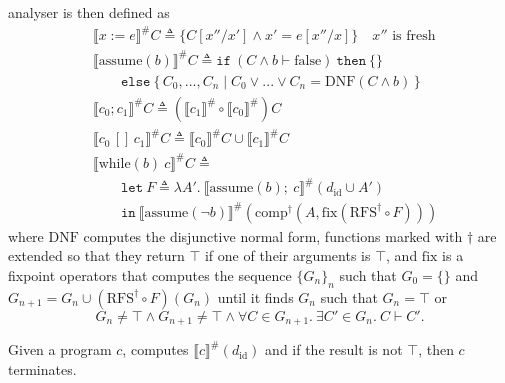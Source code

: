 \dta analyser is then defined as
\begin{align*}
  &\llbracket x:=e \rrbracket^\# C \triangleq \{ C[x''/x'] \wedge x' = e[x''/x]\}\quad x''\text{ is fresh}\\
  &\llbracket \mathrm{assume}(b) \rrbracket^\# C \triangleq \mathtt{if}\ (C \wedge b \vdash \mathrm{false})\ \mathtt{then}\ \{\}\\
  &\quad\quad \mathtt{else}\ \{\,C_0, ..., C_n \mid C_0 \vee ... \vee C_n = \mathrm{DNF}(C \wedge b)\,\}\\
  &\llbracket c_0; c_1 \rrbracket^\# C \triangleq (\llbracket c_1 \rrbracket^\# \circ \llbracket c_0 \rrbracket^\#) C\\
  &\llbracket c_0\,[]\,c_1 \rrbracket^\# C \triangleq \llbracket c_0 \rrbracket^\# C \cup \llbracket c_1 \rrbracket^\# C\\
  &\llbracket \mathrm{while}(b)\ c \rrbracket^\# C \triangleq\\
  &\quad\quad \mathtt{let}\ F \triangleq \lambda A'.\ \llbracket \mathrm{assume}(b);\ c \rrbracket^\# (d_\mathrm{id} \cup A')\\
  &\quad\quad \mathtt{in}\ \llbracket \mathrm{assume}(\neg b) \rrbracket^\# (\mathrm{comp}^\dagger(A, \mathrm{fix}(\mathrm{RFS}^\dagger \circ F)))
\end{align*}
\noindent where $\mathrm{DNF}$ computes the disjunctive normal form, functions marked with $\dagger$ are extended so that they return $\top$ if one of their arguments is $\top$, and $\mathrm{fix}$ is a fixpoint operators that computes the sequence $\{G_n\}_n$ such that $G_0 = \{\}$ and $G_{n+1} = G_n \cup (\mathrm{RFS}^\dagger \circ F)(G_n)$ until it finds $G_n$ such that $G_n=\top$ or
\begin{equation}\label{eq:fixpoint}
  G_n\neq\top \wedge G_{n+1}\neq\top \wedge \forall C\in G_{n+1}.\ \exists C'\in G_n.\ C\vdash C'.
\end{equation}

Given a program $c$, \dta computes $\llbracket c \rrbracket^\#(d_\mathrm{id})$ and if the result is not $\top$, then $c$ terminates.
